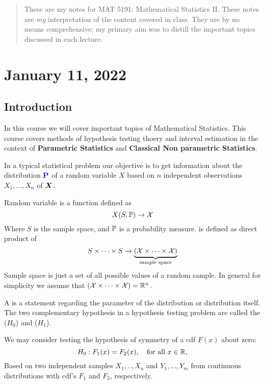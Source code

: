 \begin{abstract}
    These are my notes for MAT 5191: Mathematical Statistics II. These notes are \textit{my} interpretation of the content covered in class. 
    They are by no means comprehensive; my primary aim was to distill the important topics discussed in each lecture. 
\end{abstract}
\section{January 11, 2022}
\subsection{Introduction}
In this course we will cover important topics of Mathematical Statistics. This course covers methods of hypothesis testing thoery and interval estimation in the context of \textbf{Parametric Statistics} and \textbf{Classical Non parametric Statistics}.

In a typical statistical problem our objective is to get information about the distribution $\textbf{\color{blue} P}$ of a random variable $X$ based on $n$ independent observations $X_1,...,X_n$ of $\boldsymbol{X}$. 

\begin{definition}
Random variable is a function defined as
$$
X(S,\mathbb P) \to \mathcal X
$$
Where $S$ is the sample space, and $\mathbb P$ is a probability measure.
 is defined as direct product of 
$$
S \times \cdots \times S \to \underbrace{(\mathcal X \times \cdots \times \mathcal X)}_\text{sample space}
$$
Sample space is just a set of all possible values of a random sample.
In general for simplicity we assume that $(\mathcal X \times \cdots \times \mathcal X) = \mathbb R^n$.

\end{definition}

A  is a statement regarding the parameter of the distribution or distribution itself. The two complementary hypothesis in a hypothesis testing problem are called the  ($H_0$) and  ($H_1$).

\begin{example}
We may consider testing the hypothesis of symmetry of a cdf $F(x)$ about zero:
$$
H_0: F_1(x) = F_2(x), \quad \text{for all } x \in \mathbb R,
$$
Based on two independent samples $X_1,..,X_n$ and $Y_1,...,Y_m$ from continuous distributions with cdf's $F_1$ and $F_2$, respectively.
\end{example}

